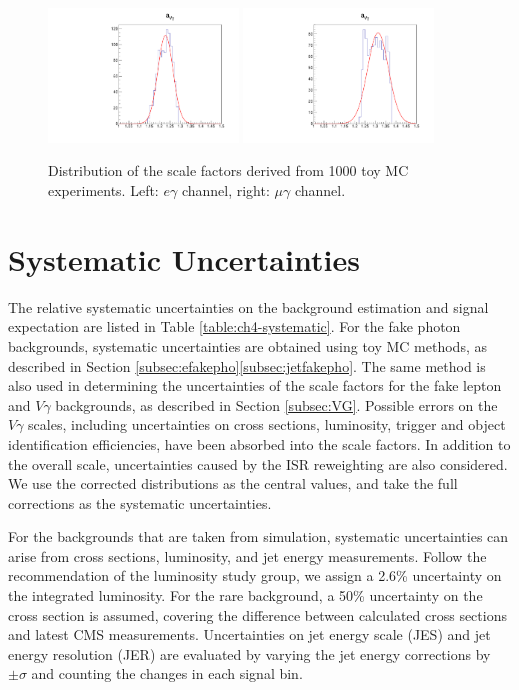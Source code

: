 \documentclass[thesis.tex]{subfiles}
\renewcommand\_{\textunderscore\allowbreak}
\begin{document}
\begin{figure}
  \centering
    \includegraphics[width=0.45\textwidth]{Figures/VGammaScale_eg.pdf}
    \includegraphics[width=0.45\textwidth]{Figures/VGammaScale_mg.pdf}
  \caption{Distribution of the scale factors derived from 1000 toy MC experiments. Left: $e\gamma$ channel, right: $\mu\gamma$ channel.}
    \label{fig:dphisystematic}
\end{figure}

\section{Systematic Uncertainties}
The relative systematic uncertainties on the background estimation and signal expectation are listed in Table \ref{table:ch4-systematic}. For the fake photon backgrounds, systematic uncertainties are obtained using toy MC methods, as described in Section \ref{subsec:efakepho}\ref{subsec:jetfakepho}. The same method is also used in determining the uncertainties of the scale factors for the fake lepton and $V\gamma$ backgrounds, as described in Section \ref{subsec:VG}. Possible errors on the $V\gamma$ scales, including uncertainties on cross sections, luminosity, trigger and object identification efficiencies, have been absorbed into the scale factors. In addition to the overall scale, uncertainties caused by the ISR reweighting are also considered. We use the corrected distributions as the central values, and take the full corrections as the systematic uncertainties.

For the backgrounds that are taken from simulation, systematic uncertainties can arise from cross sections, luminosity, and jet energy measurements.  Follow the recommendation of the luminosity study group, we assign a 2.6\% uncertainty on the integrated luminosity. For the rare background, a 50\% uncertainty on the cross section is assumed, covering the difference between calculated cross sections and latest CMS measurements. Uncertainties on jet energy scale (JES) and jet energy resolution (JER) are evaluated by varying the jet energy corrections by $\pm\sigma$ and counting the changes in each signal bin.
\end{document}
